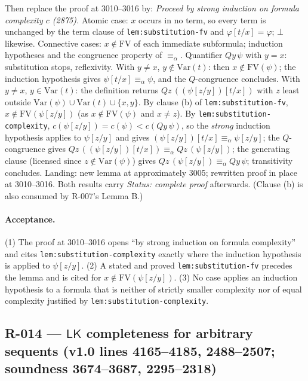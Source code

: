 Then replace the proof at 3010--3016 by: \emph{Proceed by strong induction on
formula complexity \(c\) (2875).}  Atomic case: \(x\) occurs in no term, so
every term is unchanged by the term clause of \texttt{lem:substitution-fv} and
\(\varphi[t/x]=\varphi\); \(\bot\) likewise.  Connective cases:
\(x\notin\mathrm{FV}\) of each immediate subformula; induction hypotheses and
the congruence property of \(\equiv_\alpha\).  Quantifier \(Qy\,\psi\) with
\(y=x\): substitution stops, reflexivity.  With \(y\ne x\),
\(y\notin\mathrm{Var}(t)\): then \(x\notin\mathrm{FV}(\psi)\); the induction
hypothesis gives \(\psi[t/x]\equiv_\alpha\psi\), and the \(Q\)-congruence
concludes.  With \(y\ne x\), \(y\in\mathrm{Var}(t)\): the definition returns
\(Qz\,((\psi[z/y])[t/x])\) with \(z\) least outside
\(\mathrm{Var}(\psi)\cup\mathrm{Var}(t)\cup\{x,y\}\).  By clause (b) of
\texttt{lem:substitution-fv}, \(x\notin\mathrm{FV}(\psi[z/y])\) (as
\(x\notin\mathrm{FV}(\psi)\) and \(x\ne z\)).  By
\texttt{lem:substitution-complexity}, \(c(\psi[z/y])=c(\psi)<c(Qy\,\psi)\), so
the \emph{strong} induction hypothesis applies to \(\psi[z/y]\) and gives
\((\psi[z/y])[t/x]\equiv_\alpha\psi[z/y]\); the \(Q\)-congruence gives
\(Qz\,((\psi[z/y])[t/x])\equiv_\alpha Qz\,(\psi[z/y])\); the generating clause
(licensed since \(z\notin\mathrm{Var}(\psi)\)) gives
\(Qz\,(\psi[z/y])\equiv_\alpha Qy\,\psi\); transitivity concludes.  Landing:
new lemma at approximately 3005; rewritten proof in place at 3010--3016.  Both
results carry \textit{Status: complete proof} afterwards.  (Clause (b) is also
consumed by R-007's Lemma B.)

\paragraph{Acceptance.}
(1) The proof at 3010--3016 opens ``by strong induction on formula
complexity'' and cites \texttt{lem:substitution-complexity} exactly where the
induction hypothesis is applied to \(\psi[z/y]\).  (2) A stated and proved
\texttt{lem:substitution-fv} precedes the lemma and is cited for
\(x\notin\mathrm{FV}(\psi[z/y])\).  (3) No case applies an induction
hypothesis to a formula that is neither of strictly smaller complexity nor of
equal complexity justified by \texttt{lem:substitution-complexity}.

\subsection*{R-014 --- \(\mathsf{LK}\) completeness for arbitrary sequents (v1.0 lines 4165--4185, 2488--2507; soundness 3674--3687, 2295--2318)}

